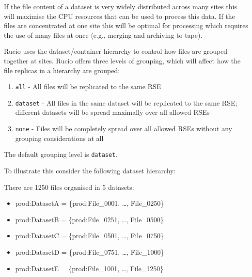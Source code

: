 \documentclass{atlasnote}
\newcommand{\code}[1]{\texttt{#1}}
\begin{document}
If the file content of a dataset is very widely distributed across many sites this will maximise the CPU resources that can be used to process this data. If the files are concentrated at one site this will be optimal for processing which requires the use of many files at once (e.g., merging and archiving to tape).

Rucio uses the dataset/container hierarchy to control how files are grouped together at sites. Rucio offers three levels of grouping, which will affect how the file replicas in a hierarchy are grouped:
\begin{enumerate}
    \item[] \code{all} -  All files will be replicated to the same RSE
    \item[] \code{dataset} - All files in the same dataset will be replicated to the same RSE; different datasets will be spread maximally over all allowed RSEs
    \item[] \code{none} - Files will be completely spread over all allowed RSEs without any grouping considerations at all
\end{enumerate}

The default grouping level is \code{dataset}.

To illustrate this consider the following dataset hierarchy:

{\hfill{}\hfill}

There are 1250 files organised in 5 datasets:
\begin{itemize}
	\item[] prod:DatasetA = \{prod:File\_0001, \ldots, File\_0250\}
	\item[] prod:DatasetB = \{prod:File\_0251, \ldots, File\_0500\}
	\item[] prod:DatasetC = \{prod:File\_0501, \ldots, File\_0750\}
	\item[] prod:DatasetD = \{prod:File\_0751, \ldots, File\_1000\}
	\item[] prod:DatasetE = \{prod:File\_1001, \ldots, File\_1250\}
\end{itemize}
\end{document}
